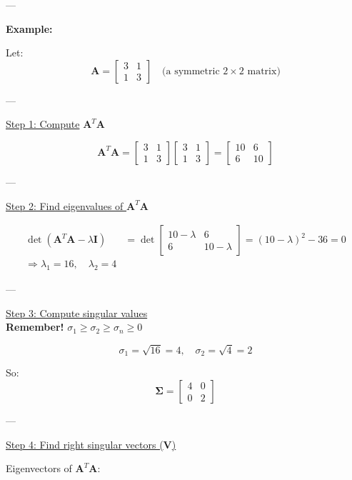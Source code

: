 ---

\textbf{Example:}

Let:
\[
\textbf{A} =
\begin{bmatrix}
3 & 1 \\
1 & 3
\end{bmatrix}
\quad \text{(a symmetric \(2 \times 2\) matrix)}
\]

---

\underline{Step 1: Compute} \(\textbf{A}^T\textbf{A}\)

\[
\textbf{A}^T \textbf{A} = 
\begin{bmatrix}
3 & 1 \\
1 & 3
\end{bmatrix}
\begin{bmatrix}
3 & 1 \\
1 & 3
\end{bmatrix}
=
\begin{bmatrix}
10 & 6 \\
6 & 10
\end{bmatrix}
\]

---

\underline{Step 2: Find eigenvalues of \(\textbf{A}^T\textbf{A}\)}

\begin{align*}
\det(\textbf{A}^T\textbf{A} - \lambda \textbf{I}) &= 
\det\begin{bmatrix}
10 - \lambda & 6 \\
6 & 10 - \lambda
\end{bmatrix} = (10 - \lambda)^2 - 36 = 0 \\
\Rightarrow \lambda_1 = 16, \quad \lambda_2 = 4
\end{align*}

---

\underline{Step 3: Compute singular values} \\

\textbf{Remember!} $\sigma_1 \geq \sigma_2 \geq \sigma_n \geq 0$

\[
\sigma_1 = \sqrt{16} = 4, \quad \sigma_2 = \sqrt{4} = 2
\]

So:
\[
\boldsymbol{\Sigma} =
\begin{bmatrix}
4 & 0 \\
0 & 2
\end{bmatrix}
\]

---

\underline{Step 4: Find right singular vectors (\(\textbf{V}\))}

Eigenvectors of \(\textbf{A}^T\textbf{A}\):

